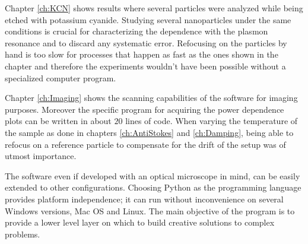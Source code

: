 Chapter \ref{ch:KCN} shows results where several particles were analyzed while
being etched with potassium cyanide. Studying several nanoparticles under the
same conditions is crucial for characterizing the dependence with the plasmon
resonance and to discard any systematic error. Refocusing on the particles by
hand is too slow for processes that happen as fast as the ones shown in the
chapter and therefore the experiments wouldn't have been possible without a
specialized computer program. 

Chapter \ref{ch:Imaging} shows the scanning capabilities of the software for
imaging purposes. Moreover the specific program for acquiring the power
dependence plots can be written in about $20$ lines of code. When varying the
temperature of the sample as done in chapters \ref{ch:AntiStokes} and
\ref{ch:Damping}, being able to refocus on a reference particle to compensate
for the drift of the setup was of utmost importance.

The software even if developed with an optical microscope in mind, can be easily
extended to other configurations. Choosing Python as the programming language
provides platform independence; it can run without inconvenience on several
Windows versions, Mac OS and Linux. The main objective of the program is to
provide a lower level layer on which to build creative solutions to complex
problems.

